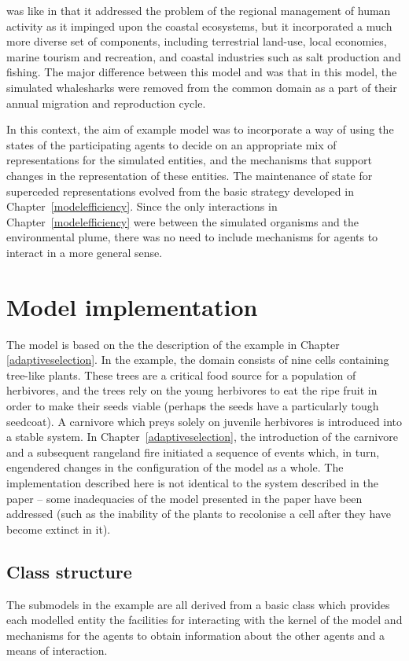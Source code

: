 \cite{gray2014} was like \cite{gray2006nws} in that it addressed the
problem of the regional management of human activity as it impinged
upon the coastal ecosystems, but it incorporated a much more diverse
set of components, including terrestrial land-use, local economies,
marine tourism and recreation, and coastal industries such as salt
production and fishing. The major difference between this model and
\cite{gray2006nws} was that in this model, the simulated whalesharks were
removed from the common domain as a part of their annual migration and
reproduction cycle. 

In this context, the aim of example model was to incorporate a way of
using the states of the participating agents to decide on an
appropriate mix of representations for the simulated entities, and the
mechanisms that support changes in the representation of these
entities. The maintenance of state for superceded representations
evolved from the basic strategy developed in
Chapter~\ref{modelefficiency}.  Since the only interactions in
Chapter~\ref{modelefficiency} were between the simulated organisms and
the environmental plume, there was no need to include mechanisms for
agents to interact in a more general sense.

\section{Model implementation}
The model is based on the the description of the example in Chapter
\ref{adaptiveselection}. In the example, the domain consists of nine
cells containing tree-like plants. These trees are a critical food
source for a population of herbivores, and the trees rely on the young
herbivores to eat the ripe fruit in order to make their seeds viable
(perhaps the seeds have a particularly tough seedcoat). A carnivore
which preys solely on juvenile herbivores is introduced into a stable
system.  In Chapter~\ref{adaptiveselection}, the introduction of the
carnivore and a subsequent rangeland fire initiated a sequence of
events which, in turn, engendered changes in the configuration of the
model as a whole.  The implementation described here is not identical
to the system described in the paper -- some inadequacies of the model
presented in the paper have been addressed (such as the inability of
the plants to recolonise a cell after they have become extinct in it).

\subsection{Class structure}
The submodels in the example are all derived from a basic
 class which provides each modelled entity the
facilities for interacting with the kernel of the model and mechanisms
for the agents to obtain information about the other agents and a
means of interaction.

